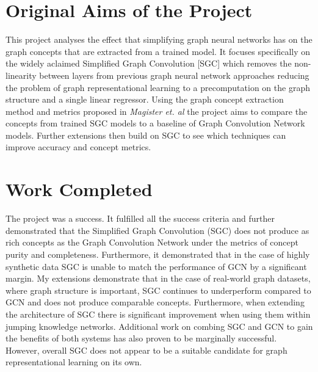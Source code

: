 \documentclass[12pt,a4paper,twoside,openright]{report}
\begin{document}

\section*{Original Aims of the Project}


This project analyses the effect that simplifying graph neural networks has on the graph concepts that are extracted from a trained model.
It focuses specifically on the widely aclaimed Simplified Graph Convolution \cite{wu2019simplifying}[SGC] which removes the non-linearity between layers from previous graph neural network approaches reducing the problem of graph representational learning to a precomputation on the graph structure and a single linear regressor.
Using the graph concept extraction method and metrics proposed in \textit{Magister et. al} \cite{magister2021gcexplainer} the project aims to compare the concepts from trained SGC models to a baseline of Graph Convolution Network models.
Further extensions then build on SGC to see which techniques can improve accuracy and concept metrics.

\section*{Work Completed}

The project was a success. 
It fulfilled all the success criteria and further demonstrated that the Simplified Graph Convolution (SGC) does not produce as rich concepts as the Graph Convolution Network under the metrics of concept purity and completeness. 
Furthermore, it demonstrated that in the case of highly synthetic data SGC is unable to match the performance of GCN by a significant margin. 
My extensions demonstrate that in the case of real-world graph datasets, where graph structure is important, SGC continues to underperform compared to GCN and does not produce comparable concepts.
Furthermore, when extending the architecture of SGC there is significant improvement when using them within jumping knowledge networks\cite{xu2018representation}.
Additional work on combing SGC and GCN to gain the benefits of both systems has also proven to be marginally successful.
However, overall SGC does not appear to be a suitable candidate for graph representational learning on its own.
\end{document}
